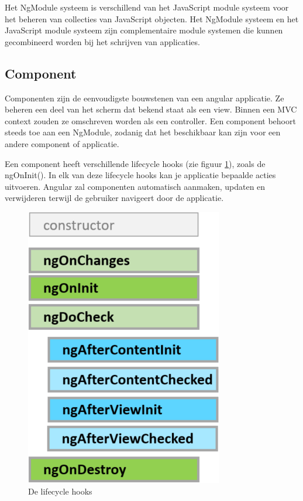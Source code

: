 Het NgModule systeem is verschillend van het JavaScript module systeem voor het beheren van collecties van JavaScript objecten. Het NgModule systeem en het JavaScript module systeem zijn complementaire module systemen die kunnen gecombineerd worden bij het schrijven van applicaties. 

\subsection{Component}
Componenten zijn de eenvoudigste bouwstenen van een angular applicatie. Ze beheren een deel van het scherm dat bekend staat als een view. Binnen een MVC context zouden ze omschreven worden als een controller. Een component behoort steeds toe aan een NgModule, zodanig dat het beschikbaar kan zijn voor een andere component of applicatie. 

Een component heeft verschillende lifecycle hooks (zie figuur \ref{fig:lifecyclehooks}), zoals de ngOnInit(). In elk van deze lifecycle hooks kan je applicatie bepaalde acties uitvoeren. Angular zal componenten automatisch aanmaken, updaten en verwijderen terwijl de gebruiker navigeert door de applicatie. 

\begin{figure}[H]
	\centering
	\includegraphics[width=0.6\linewidth]{lifecyclehooks}
	\caption{De lifecycle hooks \autocite{dartlang2019}}
	\label{fig:lifecyclehooks}
\end{figure}

